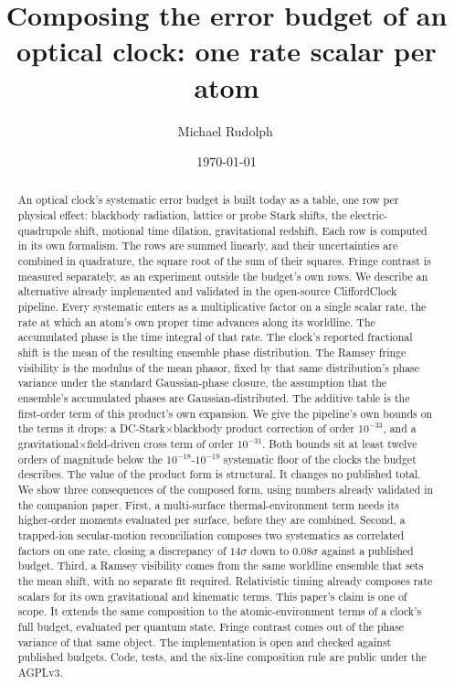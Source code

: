 \documentclass[aps,pra,superscriptaddress,groupedaddress,nofootinbib]{revtex4-2}
\begin{document}
\title{Composing the error budget of an optical clock: one rate scalar per atom}

\author{Michael Rudolph\,}

\date{\today}

\begin{abstract}
An optical clock's systematic error budget is built today as a table,
one row per physical effect: blackbody radiation, lattice or probe
Stark shifts, the electric-quadrupole shift, motional time dilation,
gravitational redshift. Each row is computed in its own formalism.
The rows are summed linearly, and their uncertainties are combined in
quadrature, the square root of the sum of their squares. Fringe
contrast is measured separately, as an experiment outside the
budget's own rows.
We describe an alternative already implemented and
validated in the open-source CliffordClock pipeline. Every systematic
enters as a multiplicative factor on a single scalar rate, the rate
at which an atom's own proper time advances along its worldline. The
accumulated phase is the time integral of that rate. The clock's
reported fractional shift is the mean of the resulting ensemble phase
distribution. The Ramsey fringe visibility is the modulus of the
mean phasor, fixed by that same distribution's phase variance
under the standard Gaussian-phase closure, the assumption that the
ensemble's accumulated phases are Gaussian-distributed. The additive
table is the first-order term of this product's own expansion. We
give the pipeline's own bounds on the terms it drops: a
DC-Stark$\times$blackbody product correction of order $10^{-33}$, and a
gravitational$\times$field-driven cross term of order $10^{-31}$.
Both bounds sit at least twelve orders of magnitude below the $10^{-18}$-$10^{-19}$
systematic floor of the clocks the budget describes. The value of the
product form is structural. It changes no published total. We show three consequences of the
composed form, using numbers already validated in the companion
paper. First, a multi-surface thermal-environment term needs its
higher-order moments evaluated per surface, before they are combined.
Second, a trapped-ion secular-motion reconciliation composes two
systematics as correlated factors on one rate, closing a discrepancy
of $14\sigma$ down to $0.08\sigma$ against a published budget. Third,
a Ramsey visibility comes from the same worldline ensemble that sets
the mean shift, with no separate fit required. Relativistic timing
already composes rate scalars for its own gravitational and kinematic
terms. This paper's claim is one of scope. It extends the same
composition to the atomic-environment terms of a clock's full budget,
evaluated per quantum state. Fringe contrast comes out of the phase
variance of that same object. The implementation is open and checked
against published budgets. Code,
tests, and the six-line composition rule are public under the
AGPLv3.
\end{abstract}
\end{document}
